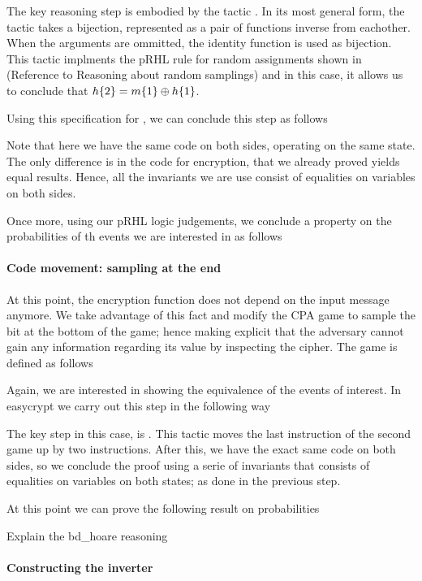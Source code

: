The key reasoning step is embodied by the tactic . In its most general form, the 
tactic takes a bijection, represented as a pair of functions inverse
from eachother. When the arguments are ommitted, the identity function
is used as bijection. This tactic implments the pRHL rule for random
assignments shown in (Reference to Reasoning about random samplings)
and in this case, it allows us to conclude that ${h\{2\} = m\{1\} \oplus
  h\{1\}}$.

Using this specification for , we can conclude this step as
follows

Note that here we have the same code on both sides, operating on the
same state. The only difference is in the code for encryption, that we
already proved yields equal results. Hence, all the invariants we are
use consist of equalities on variables on both sides. 

Once more, using our pRHL logic judgements, we conclude a property on
the probabilities of th events we are interested in as follows






\paragraph{Code movement: sampling  at the end}
At this point, the encryption function does not depend on the input
message anymore. We take advantage of this fact and modify the CPA
game to sample the bit  at the bottom of the game; hence making
explicit that the adversary cannot gain any information regarding its
value by inspecting the cipher. The  game is defined as
follows

Again, we are interested in showing the equivalence of the events of
interest. In easycrypt we carry out this step in the following way

The key step in this case, is . This tactic moves the
last instruction of the second game  %
up by two instructions. After this, we have the exact same code on
both sides, so we conclude the proof using a serie of invariants that
consists of equalities on variables on both states; as done in the
previous step. 

At this point we can prove the following result on probabilities

Explain the bd\_hoare reasoning


\paragraph{Constructing the inverter}

